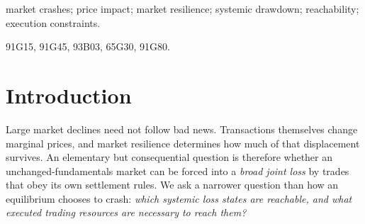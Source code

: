 \documentclass[review,hidelinks,onefignum,onetabnum]{siamonline250211}
\begin{document}
\maketitle
\begin{abstract}
In a resilient $N$-asset market with fixed fundamentals and paired-dollar execution, we prove that response elasticity $e(S)=Sg'(S)/g(S)\ge2$ excludes every positive systemic drawdown, whereas $e(S)\ge1$ excludes a simultaneous decline of all assets. The proof uses a response-adapted generalized price coordinate $\Phi(S)=\int_F^S u/g(u)\,\mathrm{d}u$, uniquely normalized so that an executed-dollar transfer produces an equal coordinate displacement. This reveals an additive trading conservation law and a recovery-driven stability barrier. Within the common family $g_p(S)=\eta(S/F)^p$, the regimes $p=2,1,0$ respectively yield exclusion, inventory-bounded partial-coverage losses, and arbitrarily severe partial-coverage log losses under uniform finite turnover and inventory when pulses are permitted. We establish necessary dollar-turnover and share-inventory bounds. For constant per-share impact and bounded gross share rates, the maximal small-rate systemic loss is of quadratic order, with an attaining-order continuous construction. Rolling daily price limits constrain individual sessions but need not exclude multiday losses: a computer-assisted ten-asset path has nine assets reach their lower closing limits on two successive sessions, closes every executed-dollar ledger, and attains systemic log loss above $0.020$. In this example the required gross-rate cap satisfies $0.044<\bar v_*<0.285$.
\end{abstract}
\begin{keywords}market crashes; price impact; market resilience; systemic drawdown; reachability; execution constraints.\end{keywords}
\begin{MSCcodes}91G15, 91G45, 93B03, 65G30, 91G80.\end{MSCcodes}

\section{Introduction}\label{sec:intro}
Large market declines need not follow bad news. Transactions themselves change marginal prices, and market resilience determines how much of that displacement survives. An elementary but consequential question is therefore whether an unchanged-fundamentals market can be forced into a \emph{broad joint loss} by trades that obey its own settlement rules. We ask a narrower question than how an equilibrium chooses to crash: \emph{which systemic loss states are reachable, and what executed trading resources are necessary to reach them?}
\end{document}
